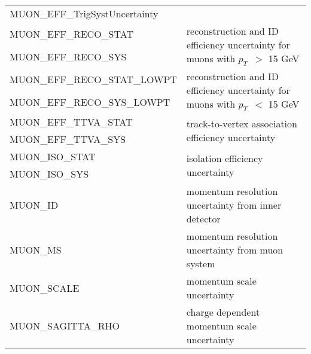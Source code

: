 \begin{table}
{\begin{tabular}{ll}
MUON\_EFF\_TrigSystUncertainty & \\%
MUON\_EFF\_RECO\_STAT &  \multirow{2}{*}{reconstruction and ID efficiency uncertainty for muons with $p_T$\ $>$ 15 GeV} \\%
MUON\_EFF\_RECO\_SYS &  \\%
MUON\_EFF\_RECO\_STAT\_LOWPT & \multirow{2}{*}{reconstruction and ID efficiency uncertainty for muons with $p_T$\ $<$ 15 GeV} \\%
MUON\_EFF\_RECO\_SYS\_LOWPT &  \\%
MUON\_EFF\_TTVA\_STAT\footnotemark[10] &  \multirow{2}{*}{track-to-vertex association efficiency uncertainty} \\%
MUON\_EFF\_TTVA\_SYS\footnotemark[10] &                      \\%
MUON\_ISO\_STAT &  \multirow{2}{*}{isolation efficiency uncertainty} \\%
MUON\_ISO\_SYS &                     \\%
MUON\_ID & momentum resolution uncertainty from inner detector        \\%
MUON\_MS &  momentum resolution uncertainty from muon system        \\%
MUON\_SCALE &   momentum scale uncertainty         \\%
MUON\_SAGITTA\_RHO & \multirow{2}{*}{charge dependent momentum scale uncertainty} \\%

\end{tabular}}
\end{table}
